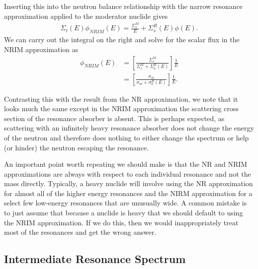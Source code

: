 Inserting this into the neutron balance relationship with the narrow resonance approximation applied to the moderator nuclide gives
\begin{align}
  \Sigma_t(E) \phi_{NRIM}(E) = \frac{ \Sigma_s^M }{ E } + \Sigma_s^R(E) \phi(E) .
\end{align}
We can carry out the integral on the right and solve for the scalar flux in the NRIM approximation as
\begin{align}
  \phi_{NRIM}(E) 
  &= \left[ \frac{ \Sigma_s^M }{ \Sigma_s^M + \Sigma_a^R(E) } \right] \frac{1}{E}  \nonumber \\
  &= \left[ \frac{ \sigma_m }{ \sigma_m + \sigma_a^R(E) } \right] \frac{1}{E}  .
\end{align}

Contrasting this with the result from the NR approximation, we note that it looks much the same except in the NRIM approximation the scattering cross section of the resonance absorber is absent. This is perhaps expected, as scattering with an infinitely heavy resonance absorber does not change the energy of the neutron and therefore does nothing to either change the spectrum or help (or hinder) the neutron escaping the resonance.

An important point worth repeating we should make is that the NR and NRIM approximations are always with respect to each individual resonance and not the mass directly. Typically, a heavy nuclide will involve using the NR approximation for almost all of the higher energy resonances and the NIRM approximation for a select few low-energy resonances that are unusually wide. A common mistake is to just assume that because a nuclide is heavy that we should default to using the NRIM approximation. If we do this, then we would inappropriately treat most of the resonances and get the wrong answer.

\subsection{Intermediate Resonance Spectrum}

